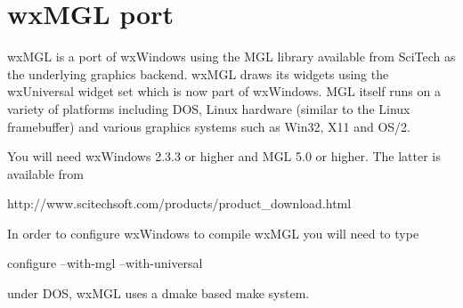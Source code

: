 \section{wxMGL port}\label{wxmglport}

wxMGL is a port of wxWindows using the MGL library available
from SciTech as the underlying graphics backend. wxMGL draws
its widgets using the wxUniversal widget set which is now
part of wxWindows. MGL itself runs on a variety of platforms
including DOS, Linux hardware (similar to the Linux framebuffer)
and various graphics systems such as Win32, X11 and OS/2.

You will need wxWindows 2.3.3 or higher and MGL 5.0 or higher.
The latter is available from

  http://www.scitechsoft.com/products/product_download.html
  
In order to configure wxWindows to compile wxMGL you will 
need to type

  configure --with-mgl --with-universal
  
under DOS, wxMGL uses a dmake based make system.